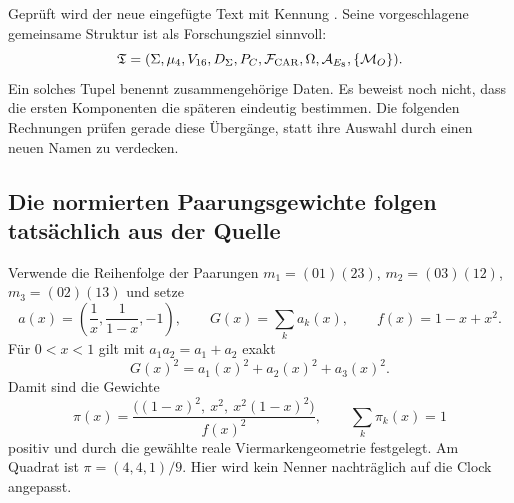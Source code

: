 
Geprüft wird der neue eingefügte Text mit Kennung
.
Seine vorgeschlagene gemeinsame Struktur ist als Forschungsziel sinnvoll:
\begin{equation}
\mathfrak T=
(\Sigma,\mu_4,V_{16},D_\Sigma,P_C,\mathcal F_{\rm CAR},
\Omega,\mathcal A_{E_8},\{\mathcal M_O\}).
\end{equation}
Ein solches Tupel benennt zusammengehörige Daten. Es beweist noch nicht, dass die ersten Komponenten die späteren eindeutig bestimmen. Die folgenden Rechnungen prüfen gerade diese Übergänge, statt ihre Auswahl durch einen neuen Namen zu verdecken.

\subsection{Die normierten Paarungsgewichte folgen tatsächlich aus der Quelle}
Verwende die Reihenfolge der Paarungen
$m_1=(01)(23)$, $m_2=(03)(12)$, $m_3=(02)(13)$ und setze
\begin{equation}
a(x)=\left(\frac1x,\frac1{1-x},-1\right),\qquad
G(x)=\sum_k a_k(x),\qquad f(x)=1-x+x^2.
\end{equation}
Für $0<x<1$ gilt mit $a_1a_2=a_1+a_2$ exakt
\begin{equation}\label{eq:pairingnorm}
\boxed{G(x)^2=a_1(x)^2+a_2(x)^2+a_3(x)^2.}
\end{equation}
Damit sind die Gewichte
\begin{equation}\label{eq:pairingweights}
\boxed{\pi(x)=
\frac{\bigl((1-x)^2,\ x^2,\ x^2(1-x)^2\bigr)}{f(x)^2},
\qquad \sum_k\pi_k(x)=1}
\end{equation}
positiv und durch die gewählte reale Viermarkengeometrie festgelegt.
Am Quadrat ist $\pi=(4,4,1)/9$. Hier wird kein Nenner nachträglich auf die Clock angepasst.

